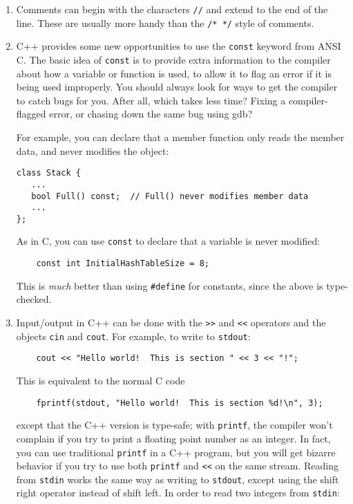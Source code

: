 \begin{enumerate}
\item Comments can begin with the characters \verb+//+ and extend to
the end of the line.  These are usually more handy than the
\verb+/* */+ style of comments.

\item C++ provides some new opportunities to use the 
{\tt const} keyword from ANSI C.  The basic idea of {\tt const}
is to provide extra information to the compiler about how a variable
or function is used, to allow it to flag an error if it is being 
used improperly.  You should always look for ways to get the compiler 
to catch bugs for you.  After all, which takes less time?  Fixing
a compiler-flagged error, or chasing down the same bug using gdb?  

For example, you can declare that a member function only reads the 
member data, and never modifies the object:

\begin{verbatim}
class Stack {
   ...
   bool Full() const;  // Full() never modifies member data
   ...
};
\end{verbatim}

As in C, you can use {\tt const} to declare that a variable is never 
modified:

\begin{verbatim}
    const int InitialHashTableSize = 8;
\end{verbatim}

This is {\em much} better than using {\tt \#define} for constants,
since the above is type-checked.

\item Input/output in C++ can be done with the {\tt >>} and {\tt <<}
operators and the objects {\tt cin} and {\tt cout}.  For example,
to write to {\tt stdout}:

\begin{verbatim}
    cout << "Hello world!  This is section " << 3 << "!";
\end{verbatim}

This is equivalent to the normal C code

\begin{verbatim}
    fprintf(stdout, "Hello world!  This is section %d!\n", 3);
\end{verbatim}

except that the C++ version is type-safe; with {\tt printf}, the
compiler won't complain if you try to print a floating point number
as an integer. In fact, you can use traditional {\tt printf} in a C++
program, but you will get bizarre behavior if you try to use both
{\tt printf} and {\tt <<} on the same stream.  Reading from {\tt stdin}
works the same way as writing to {\tt stdout}, except using the shift 
right operator instead of shift left.  
In order to read two integers from {\tt stdin}:


\end{enumerate}
